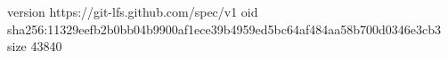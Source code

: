 version https://git-lfs.github.com/spec/v1
oid sha256:11329eefb2b0bb04b9900af1ece39b4959ed5bc64af484aa58b700d0346e3cb3
size 43840
